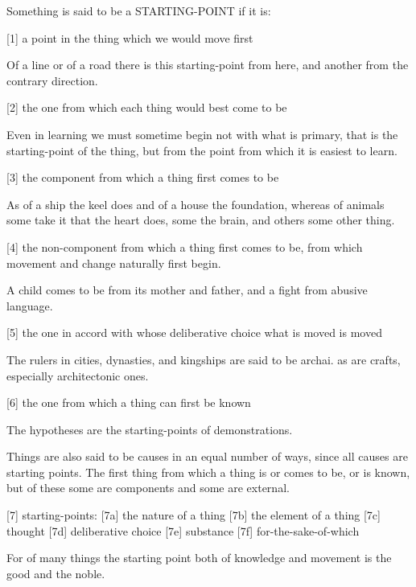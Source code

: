 
Something is said to be a STARTING-POINT if it is:

[1]     a point in the thing which we would move first

        Of a line or of a road there is this starting-point from here,
        and another from the contrary direction.

[2]     the one from which each thing would best come to be

        Even in learning we must sometime begin not with what is primary,
        that is the starting-point of the thing, but from
        the point from which it is easiest to learn.

[3]     the component from which a thing first comes to be

        As of a ship the keel does and of a house the foundation,
        whereas of animals some take it that the heart does,
        some the brain, and others some other thing.

[4]     the non-component from which a thing first comes to be,
        from which movement and change naturally first begin.

        A child  comes to be from its mother and father,
        and a fight from abusive language.

[5]     the one in accord with whose deliberative choice what is moved is moved

        The rulers in cities, dynasties, and kingships are said to be archai.
        as are crafts, especially architectonic ones.

[6]     the one from which a thing can first be known

        The hypotheses are the starting-points of demonstrations.

Things are also said to be causes in an equal number of ways,
since all causes are starting points.
The first thing from which a thing is or comes to be, or is known,
but of these some are components and some are external.

[7]     starting-points:
[7a]    the nature of a thing
[7b]    the element of a thing
[7c]    thought
[7d]    deliberative choice
[7e]    substance
[7f]    for-the-sake-of-which

For of many things the starting point both of knowledge and movement is
the good and the noble.
